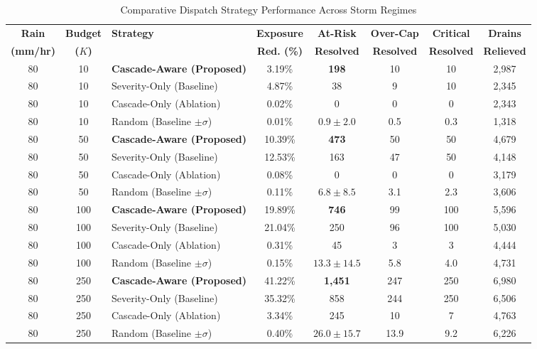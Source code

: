 \begin{table}[h!]
\centering
\caption{Comparative Dispatch Strategy Performance Across Storm Regimes}
\label{tab:experimental_summary}
\fontsize{8pt}{10pt}\selectfont
\begin{tabular}{|c|c|l|c|c|c|c|c|}
\hline
\textbf{Rain} & \textbf{Budget} & \textbf{Strategy} & \textbf{Exposure} & \textbf{At-Risk} & \textbf{Over-Cap} & \textbf{Critical} & \textbf{Drains} \\
\textbf{(mm/hr)} & \textbf{($K$)} & & \textbf{Red. (\%)} & \textbf{Resolved} & \textbf{Resolved} & \textbf{Resolved} & \textbf{Relieved} \\
\hline
80 & 10 & \textbf{Cascade-Aware (Proposed)} & 3.19\% & \textbf{198} & 10 & 10 & 2,987 \\
80 & 10 & Severity-Only (Baseline) & 4.87\% & 38 & 9 & 10 & 2,345 \\
80 & 10 & Cascade-Only (Ablation) & 0.02\% & 0 & 0 & 0 & 2,343 \\
80 & 10 & Random (Baseline $\pm \sigma$) & 0.01\% & $0.9 \pm 2.0$ & 0.5 & 0.3 & 1,318 \\
\hline
80 & 50 & \textbf{Cascade-Aware (Proposed)} & 10.39\% & \textbf{473} & 50 & 50 & 4,679 \\
80 & 50 & Severity-Only (Baseline) & 12.53\% & 163 & 47 & 50 & 4,148 \\
80 & 50 & Cascade-Only (Ablation) & 0.08\% & 0 & 0 & 0 & 3,179 \\
80 & 50 & Random (Baseline $\pm \sigma$) & 0.11\% & $6.8 \pm 8.5$ & 3.1 & 2.3 & 3,606 \\
\hline
80 & 100 & \textbf{Cascade-Aware (Proposed)} & 19.89\% & \textbf{746} & 99 & 100 & 5,596 \\
80 & 100 & Severity-Only (Baseline) & 21.04\% & 250 & 96 & 100 & 5,030 \\
80 & 100 & Cascade-Only (Ablation) & 0.31\% & 45 & 3 & 3 & 4,444 \\
80 & 100 & Random (Baseline $\pm \sigma$) & 0.15\% & $13.3 \pm 14.5$ & 5.8 & 4.0 & 4,731 \\
\hline
80 & 250 & \textbf{Cascade-Aware (Proposed)} & 41.22\% & \textbf{1,451} & 247 & 250 & 6,980 \\
80 & 250 & Severity-Only (Baseline) & 35.32\% & 858 & 244 & 250 & 6,506 \\
80 & 250 & Cascade-Only (Ablation) & 3.34\% & 245 & 10 & 7 & 4,763 \\
80 & 250 & Random (Baseline $\pm \sigma$) & 0.40\% & $26.0 \pm 15.7$ & 13.9 & 9.2 & 6,226 \\

\end{tabular}
\end{table}
